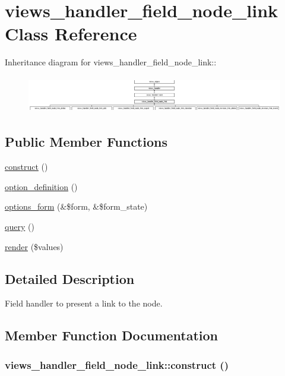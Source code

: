 \hypertarget{classviews__handler__field__node__link}{
\section{views\_\-handler\_\-field\_\-node\_\-link Class Reference}
\label{classviews__handler__field__node__link}
}
Inheritance diagram for views\_\-handler\_\-field\_\-node\_\-link::\begin{figure}[H]
\begin{center}
\leavevmode
\includegraphics[height=1.62602cm]{classviews__handler__field__node__link}
\end{center}
\end{figure}
\subsection*{Public Member Functions}
\begin{CompactItemize}
\item 
\hyperlink{classviews__handler__field__node__link_c3f643ba7dd0435fc03c7bf477907484}{construct} ()
\item 
\hyperlink{classviews__handler__field__node__link_68b2956fb07cb821f9f9ece53ddf7a20}{option\_\-definition} ()
\item 
\hyperlink{classviews__handler__field__node__link_fe6559cbf0b01700ae56fa62c5ca7616}{options\_\-form} (\&\$form, \&\$form\_\-state)
\item 
\hyperlink{classviews__handler__field__node__link_2c9b646801f273970403fea5ac4621b0}{query} ()
\item 
\hyperlink{classviews__handler__field__node__link_9621ff38a6b318eb94f0c44fa2f711f5}{render} (\$values)
\end{CompactItemize}


\subsection{Detailed Description}
Field handler to present a link to the node. 

\subsection{Member Function Documentation}
\hypertarget{classviews__handler__field__node__link_c3f643ba7dd0435fc03c7bf477907484}{
\subsubsection[{construct}]{\setlength{\rightskip}{0pt plus 5cm}views\_\-handler\_\-field\_\-node\_\-link::construct ()}}
\label{classviews__handler__field__node__link_c3f643ba7dd0435fc03c7bf477907484}



